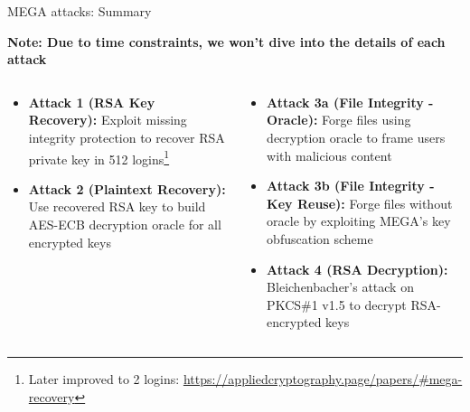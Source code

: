 \documentclass[aspectratio=169, lualatex, handout]{beamer}
\begin{document}
\begin{frame}{MEGA attacks: Summary}
	\begin{center}
		\textbf{Note: Due to time constraints, we won't dive into the details of each attack}
	\end{center}
	\begin{columns}[c]
		\begin{column}{0.5\textwidth}
			\begin{itemize}
				\item \textbf{Attack 1 (RSA Key Recovery):} Exploit missing integrity protection to recover RSA private key in 512 logins\footnote{Later improved to 2 logins: \url{https://appliedcryptography.page/papers/\#mega-recovery}}
				\item \textbf{Attack 2 (Plaintext Recovery):} Use recovered RSA key to build AES-ECB decryption oracle for all encrypted keys
			\end{itemize}
		\end{column}
		\begin{column}{0.5\textwidth}
			\begin{itemize}
				\item \textbf{Attack 3a (File Integrity - Oracle):} Forge files using decryption oracle to frame users with malicious content
				\item \textbf{Attack 3b (File Integrity - Key Reuse):} Forge files without oracle by exploiting MEGA's key obfuscation scheme
				\item \textbf{Attack 4 (RSA Decryption):} Bleichenbacher's attack on PKCS\#1 v1.5 to decrypt RSA-encrypted keys
			\end{itemize}
		\end{column}
	\end{columns}
\end{frame}
\end{document}
